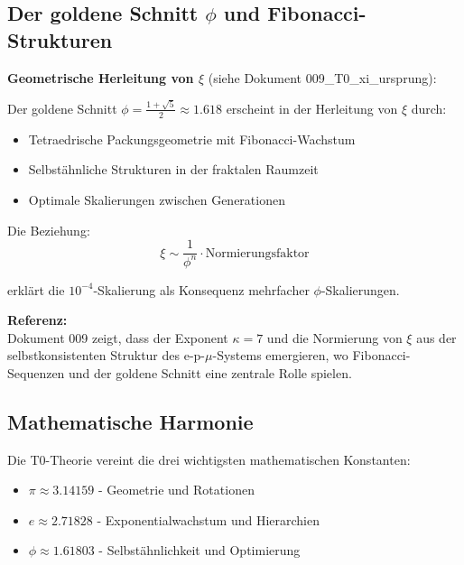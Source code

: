 	\subsection{Der goldene Schnitt $\phi$ und Fibonacci-Strukturen}
	
	\begin{beziehung}
		\textbf{Geometrische Herleitung von $\xi$} (siehe Dokument 009\_T0\_xi\_ursprung):
		
		Der goldene Schnitt $\phi = \frac{1+\sqrt{5}}{2} \approx 1.618$ erscheint in der Herleitung von $\xi$ durch:
		
		\begin{itemize}
			\item Tetraedrische Packungsgeometrie mit Fibonacci-Wachstum
			\item Selbstähnliche Strukturen in der fraktalen Raumzeit
			\item Optimale Skalierungen zwischen Generationen
		\end{itemize}
		
		Die Beziehung:
		\begin{equation}
			\xi \sim \frac{1}{\phi^n} \cdot \text{Normierungsfaktor}
		\end{equation}
		
		erklärt die $10^{-4}$-Skalierung als Konsequenz mehrfacher $\phi$-Skalierungen.
		
		\textbf{Referenz:} \\

		Dokument 009 zeigt, dass der Exponent $\kappa = 7$ und die Normierung von $\xi$ aus der selbstkonsistenten Struktur des e-p-$\mu$-Systems emergieren, wo Fibonacci-Sequenzen und der goldene Schnitt eine zentrale Rolle spielen.
	\end{beziehung}
	
	\subsection{Mathematische Harmonie}
	
	Die T0-Theorie vereint die drei wichtigsten mathematischen Konstanten:
	
	\begin{itemize}
		\item $\pi \approx 3.14159$ - Geometrie und Rotationen
		\item $e \approx 2.71828$ - Exponentialwachstum und Hierarchien  
		\item $\phi \approx 1.61803$ - Selbstähnlichkeit und Optimierung
	\end{itemize}
	
